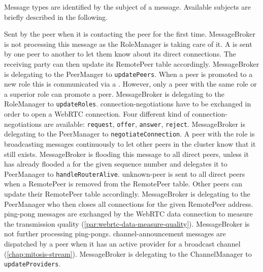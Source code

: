 Message types are identified by the subject of a message. Available subjects are briefly described in the following.
\begin{itemize}
    \label{itm:mit-msg-introduction}
        Sent by the peer when it is contacting the \signal peer for the first time. 
        MessageBroker is not processing this message as the RoleManager is taking care of it.
    \label{itm:mit-msg-PeerUpdate}
        A \peerUpdate is sent by one peer to another to let them know about its direct connections. The receiving party can then update its RemotePeer table accordingly.
        MessageBroker is delegating to the PeerManger to \lstinline|updatePeers|.
    \label{itm:mit-msg-RoleUpdate}
        When a peer is promoted to a new role this is communicated via a \roleUpdate. However, only a peer with the same role or a superior role can promote a peer.
        MessageBroker is delegating to the RoleManager to \lstinline|updateRoles|.
    \label{itm:mit-msg-ConnectionNegotiation}
        \Glspl{connection-negotiation} have to be exchanged in order to open a WebRTC connection. Four different kind of \glspl{connection-negotiation} are available: \lstinline|request|, \lstinline|offer|, \lstinline|answer|, \lstinline|reject|.
        MessageBroker is delegating to the PeerManager to \lstinline|negotiateConnection|.
    \label{itm:mit-msg-RouterAlive}
        A peer with the \routerRole role is broadcasting \routerAlive messages continuously to let other peers in the cluster know that it still exists.
        MessageBroker is flooding this message to all direct peers, unless it has already flooded a \routerAlive for the given sequence number and delegates it to PeerManager to \lstinline|handleRouterAlive|.
    \label{itm:mit-msg-UnknownPeer}
        \Gls{unknown-peer} is sent to all direct peers when a RemotePeer is removed from the RemotePeer table. Other peers can update their RemotePeer table accordingly.
        MessageBroker is delegating to the PeerManager who then closes all connections for the given RemotePeer address.
    \label{itm:mit-msg-PingPong}
        \Gls{ping-pong} messages are exchanged by the WebRTC data connection to measure the transmission quality (\vref{par:webrtc-data-measure-quality}).
        MessageBroker is not further processing \glspl{ping-pong}.
    \label{itm:mit-msg-ChannelAnnouncement}
        \Gls{channel-announcement} messages are dispatched by a peer when it has an active provider for a broadcast channel (\vref{chap:mitosis-stream}).
        MessageBroker is delegating to the ChannelManager to \lstinline|updateProviders|.
\end{itemize}
